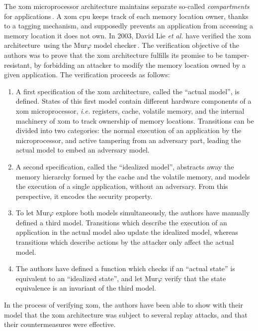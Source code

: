 The \ac{xom} microprocessor architecture maintains separate so-called
\emph{compartments} for applications\,\cite{lie2000architectural}.
%
A \ac{xom} \ac{cpu} keeps track of each memory location owner, thanks to a
tagging mechanism, and supposedly prevents an application from accessing a
memory location it does not own.
%
In 2003, David Lie \emph{et al.} have verified the \ac{xom}
architecture\,\cite{lie2003xom} using the Mur$\varphi$ model
checker\,\cite{murphi}.
%
The verification objective of the authors was to prove that the \ac{xom}
architecture fulfills its promise to be tamper-resistant, by forbidding an
attacker to modify the memory location owned by a given application.
%
The verification proceeds as follows:
%
\begin{enumerate}
\item A first specification of the \ac{xom} architecture, called the ``actual
  model'', is defined.
  States of this first model contain different hardware components of a \ac{xom}
  microprocessor, \emph{i.e.} registers, cache, volatile memory, and the
  internal machinery of \ac{xom} to track ownership of memory locations.
  Transitions can be divided into two categories: the normal execution of an
  application by the microprocessor, and active tampering from an adversary
  part, leading the actual model to embed an adversary model.
\item A second specification, called the ``idealized model'', abstracts away the
  memory hierarchy formed by the cache and the volatile memory, and models the
  execution of a single application, without an adversary.
  From this perspective, it encodes the security property.
\item To let Mur\( \varphi \) explore both models simultaneously, the authors
  have manually defined a third model.
  Transitions which describe the execution of an application in the actual model
  also update the idealized model, whereas transitions which describe actions by
  the attacker only affect the actual model.
\item The authors have defined a function which checks if an ``actual state'' is
  equivalent to an ``idealized state'', and let Mur\( \varphi \) verify that the
  state equivalence is an invariant of the third model.
\end{enumerate}
%
In the process of verifying \ac{xom}, the authors have been able to show with
their model that the \ac{xom} architecture was subject to several replay
attacks, and that their countermeasures  were effective.

